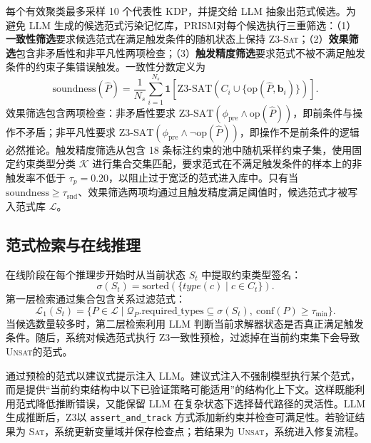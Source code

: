 \documentclass[UTF8,a4paper,12pt]{ctexart}
\newcommand{\PRISM}{PRISM}
\newcommand{\sat}{\textsc{Sat}}
\newcommand{\unsat}{\textsc{Unsat}}
\newcommand{\zthree}{Z3}
\begin{document}
每个有效聚类最多采样 10 个代表性 KDP，并提交给 LLM 抽象出范式候选。为避免 LLM 生成的候选范式污染记忆库，\PRISM 对每个候选执行三重筛选：（1）\textbf{一致性筛选}要求候选范式在满足触发条件的随机状态上保持 \zthree-\sat；（2）\textbf{效果筛选}包含非矛盾性和非平凡性两项检查；（3）\textbf{触发精度筛选}要求范式不被不满足触发条件的约束子集错误触发。一致性分数定义为
\begin{equation}
  \text{soundness}(\hat{P})=
  \frac{1}{N_s}\sum_{i=1}^{N_s}
  \mathbf{1}\left[
  \text{Z3-SAT}(C_i\cup\{\text{op}(\hat{P},\mathbf{b}_i)\})
  \right].
\end{equation}
效果筛选包含两项检查：非矛盾性要求 \(\text{Z3-SAT}(\phi_{\text{pre}}\wedge\text{op}(\hat{P}))\)，即前条件与操作不矛盾；非平凡性要求 \(\text{Z3-SAT}(\phi_{\text{pre}}\wedge\neg\text{op}(\hat{P}))\)，即操作不是前条件的逻辑必然推论。触发精度筛选从包含 18 条标注约束的池中随机采样约束子集，使用固定约束类型分类 \(\mathcal{K}\) 进行集合交集匹配，要求范式在不满足触发条件的样本上的非触发率不低于 \(\tau_p=0.20\)，以阻止过于宽泛的范式进入库中。只有当 \(\text{soundness}\geq\tau_{\text{snd}}\)、效果筛选两项均通过且触发精度满足阈值时，候选范式才被写入范式库 \(\mathcal{L}\)。

\subsection{范式检索与在线推理}

在线阶段在每个推理步开始时从当前状态 \(S_t\) 中提取约束类型签名：
\begin{equation}
  \sigma(S_t)=\text{sorted}(\{type(c)\mid c\in C_t\}).
\end{equation}
第一层检索通过集合包含关系过滤范式：
\begin{equation}
  \mathcal{L}_1(S_t)=
  \{P\in\mathcal{L}\mid \mathcal{Q}_P.\text{required\_types}\subseteq\sigma(S_t),\ \text{conf}(P)\geq\tau_{\min}\}.
\end{equation}
当候选数量较多时，第二层检索利用 LLM 判断当前求解器状态是否真正满足触发条件。随后，系统对候选范式执行 \zthree 一致性预检，过滤掉在当前约束集下会导致 \unsat 的范式。

通过预检的范式以建议式提示注入 LLM。建议式注入不强制模型执行某个范式，而是提供“当前约束结构中以下已验证策略可能适用”的结构化上下文。这样既能利用范式降低推断错误，又能保留 LLM 在复杂状态下选择替代路径的灵活性。LLM 生成推断后，\zthree 以 \texttt{assert\_and\_track} 方式添加新约束并检查可满足性。若验证结果为 \sat，系统更新变量域并保存检查点；若结果为 \unsat，系统进入修复流程。
\end{document}
